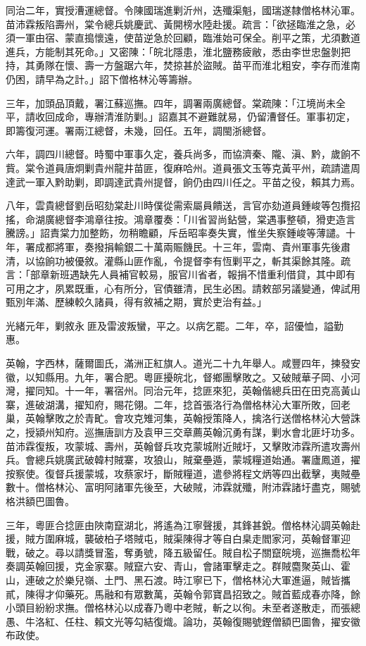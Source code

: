 \begin{pinyinscope}
同治二年，實授漕運總督。令陳國瑞進剿沂州，迭殲渠魁，國瑞遂隸僧格林沁軍。苗沛霖叛陷壽州，棠令總兵姚慶武、黃開榜水陸赴援。疏言：「欲拯臨淮之急，必須一軍由宿、蒙直搗懷遠，使苗逆急於回顧，臨淮始可保全。削平之策，尤須數道進兵，方能制其死命。」又密陳：「皖北隱患，淮北鹽務疲敝，悉由李世忠盤剝把持，其勇隊在懷、壽一方盤踞六年，焚掠甚於盜賊。苗平而淮北粗安，李存而淮南仍困，請早為之計。」詔下僧格林沁等籌辦。

三年，加頭品頂戴，署江蘇巡撫。四年，調署兩廣總督。棠疏陳：「江境尚未全平，請收回成命，專辦清淮防剿。」詔嘉其不避難就易，仍留漕督任。軍事初定，即籌復河運。署兩江總督，未幾，回任。五年，調閩浙總督。

六年，調四川總督。時蜀中軍事久定，養兵尚多，而協濟秦、隴、滇、黔，歲餉不貲。棠令道員唐炯剿貴州龍井苗匪，復麻哈州。道員張文玉等克黃平州，疏請遣周達武一軍入黔助剿，即調達武貴州提督，餉仍由四川任之。平苗之役，賴其力焉。

八年，雲貴總督劉岳昭劾棠赴川時僕從需索屬員饋送，言官亦劾道員鍾峻等包攬招搖，命湖廣總督李鴻章往按。鴻章覆奏：「川省習尚鉆營，棠遇事整頓，猾吏造言騰謗。」詔責棠力加整飭，勿稍瞻顧，斥岳昭率奏失實，惟坐失察鍾峻等薄譴。十年，署成都將軍，奏撥捐輸銀二十萬兩賑饑民。十三年，雲南、貴州軍事先後肅清，以協餉功被優敘。灌縣山匪作亂，令提督李有恆剿平之，斬其渠餘其隆。疏言：「部章新班遇缺先人員補官較易，服官川省者，報捐不惜重利借貸，其中即有可用之才，夙累既重，心有所分，官債雖清，民生必困。請敕部另議變通，俾試用甄別年滿、歷練較久諸員，得有敘補之期，實於吏治有益。」

光緒元年，剿敘永匪及雷波叛蠻，平之。以病乞罷。二年，卒，詔優恤，謚勤惠。

英翰，字西林，薩爾圖氏，滿洲正紅旗人。道光二十九年舉人。咸豐四年，揀發安徽，以知縣用。九年，署合肥。粵匪擾皖北，督鄉團擊敗之。又破賊華子岡、小河灣，擢同知。十一年，署宿州。同治元年，捻匪來犯，英翰偕總兵田在田克高黃山寨，進破湖溝，擢知府，賜花翎。二年，捻首張洛行為僧格林沁大軍所敗，回老巢，英翰擊敗之於青甿。會攻克雉河集，英翰授策降人，擒洛行送僧格林沁大營誅之，授潁州知府。巡撫唐訓方及袁甲三交章薦英翰沉勇有謀，剿水會北匪圩功多。苗沛霖復叛，攻蒙城、壽州，英翰督兵攻克蒙城附近賊圩，又擊敗沛霖所遣攻壽州兵。會總兵姚廣武破韓村賊寨，攻狼山，賊棄壘遁，蒙城糧道始通。署廬鳳道，擢按察使。復督兵援蒙城，攻蔡家圩，斷賊糧道，遣參將程文炳等四出截擊，夷賊壘數十。僧格林沁、富明阿諸軍先後至，大破賊，沛霖就殲，附沛霖諸圩盡克，賜號格洪額巴圖魯。

三年，粵匪合捻匪由陜南竄湖北，將遙為江寧聲援，其鋒甚銳。僧格林沁調英翰赴援，賊方圍麻城，襲破柏子塔賊屯，賊渠陳得才等自白臬走閻家河，英翰督軍迎戰，破之。尋以請獎冒濫，奪勇號，降五級留任。賊自松子關竄皖境，巡撫喬松年奏調英翰回援，克金家寨。賊竄六安、青山，會諸軍擊走之。群賊麕聚英山、霍山，連破之於樂兒嶺、土門、黑石渡。時江寧已下，僧格林沁大軍進逼，賊皆攜貳，陳得才仰藥死。馬融和有眾數萬，英翰令郭寶昌招致之。賊首藍成春亦降，餘小頭目紛紛求撫。僧格林沁以成春乃粵中老賊，斬之以徇。未至者遂散走，而張總愚、牛洛紅、任柱、賴文光等勾結復熾。論功，英翰復賜號鏗僧額巴圖魯，擢安徽布政使。


\end{pinyinscope}
